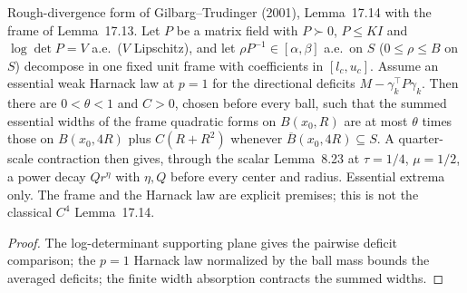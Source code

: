 \begin{lemma}
  \label{lem:frame-log-det-oscillation}
  \leanok
  Rough-divergence form of Gilbarg--Trudinger (2001), Lemma~17.14 with the frame of Lemma~17.13. Let $P$ be a matrix field with
  $P\succ0$, $P\le K I$ and $\log\det P=V$ a.e.\ ($V$ Lipschitz), and let $\rho P^{-1}\in[\alpha,\beta]$ a.e.\ on $S$
  ($0\le\rho\le B$ on $S$) decompose in one fixed unit frame with coefficients in $[l_c,u_c]$. Assume an essential weak Harnack
  law at $p=1$ for the directional deficits $M-\gamma_k^{\top}P\gamma_k$. Then there are $0<\theta<1$ and $C>0$, chosen before
  every ball, such that the summed essential widths of the frame quadratic forms on $B(x_0,R)$ are at most $\theta$ times
  those on $B(x_0,4R)$ plus $C(R+R^2)$ whenever $\overline B(x_0,4R)\subseteq S$. A quarter-scale contraction then gives,
  through the scalar Lemma~8.23 at $\tau=1/4$, $\mu=1/2$, a power decay $Qr^{\eta}$ with $\eta,Q$ before every center and
  radius. Essential extrema only. The frame and the Harnack law are explicit premises; this is not the classical $C^4$
  Lemma~17.14.
\end{lemma}
\begin{proof}
  \leanok
  The log-determinant supporting plane gives the pairwise deficit comparison; the $p=1$ Harnack law normalized by the ball
  mass bounds the averaged deficits; the finite width absorption contracts the summed widths.
\end{proof}

